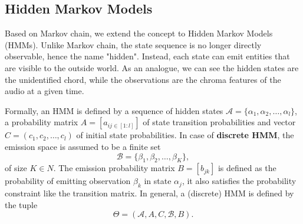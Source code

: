 \documentclass[a4paper, 9pt, twocolumn]{extarticle}
\begin{document}
\subsection{Hidden Markov Models}
\label{subsection:HMM}
Based on Markov chain, we extend the concept to Hidden Markov Models (HMMs). Unlike Markov chain, the state sequence is no longer directly observable, hence the name "hidden". Instead, each state can emit entities that are visible to the outside world. As an analogue, we can see the hidden states are the unidentified chord, while the observations are the chroma features of the audio at a given time.

Formally, an HMM is defined by
a sequence of hidden states $\mathcal{A} = \{\alpha_1, \alpha_2, \ldots, \alpha_l\}$, a probability matrix $A = [a_{ij\in [1:l]}]$ of state transition probabilities and vector $C = (c_1, c_2, \ldots, c_l)$ of initial state probabilities.
In case of \textbf{discrete HMM}, the emission space is assumed to be a finite set
\begin{equation}
    \mathcal{B} = \{\beta_1, \beta_2, \ldots, \beta_K\},
\end{equation}
of size $K \in N$. The emission probability matrix $B = [b_{jk}]$ is defined as the probability of emitting observation $\beta_k$ in state $\alpha_j$, it also satisfies the probability constraint like the transition matrix.
In general, a (discrete) HMM is defined by the tuple
\begin{equation}
    \Theta = (\mathcal{A}, A, C, \mathcal{B}, B).
\end{equation}

\end{document}

